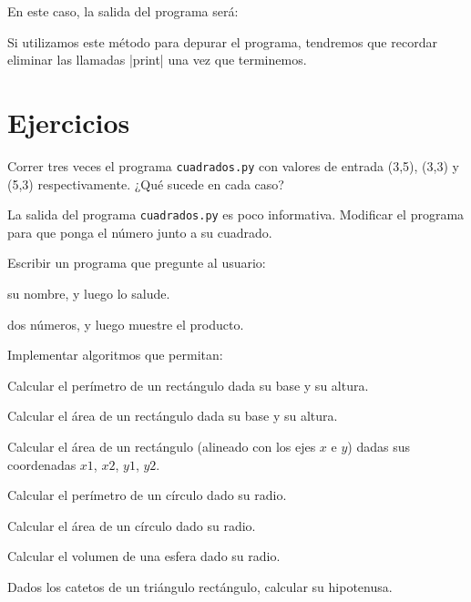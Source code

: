 En este caso, la salida del programa será:


Si utilizamos este método para depurar el programa, tendremos que recordar
eliminar las llamadas |print| una vez que terminemos.

\newpage
\section{Ejercicios}

\begin{ejercicio}
Correr tres veces el programa \lstinline!cuadrados.py! con valores
de entrada (3,5), (3,3) y (5,3) respectivamente. ¿Qué sucede en
cada caso?
\end{ejercicio}

\begin{ejercicio}
La salida del programa \lstinline!cuadrados.py! es poco
informativa. Modificar el programa para que ponga el
número junto a su cuadrado.
\end{ejercicio}

\begin{ejercicio}
Escribir un programa que pregunte al usuario:
\begin{partes}
  \item su nombre, y luego lo salude.
  \item dos números, y luego muestre el producto.
\end{partes}
\end{ejercicio}

\begin{ejercicio} Implementar algoritmos que permitan:
\begin{partes}
 \item Calcular el perímetro de un rectángulo dada su base y su altura.
 \item Calcular el área de un rectángulo dada su base y su altura.
 \item Calcular el área de un rectángulo (alineado con los ejes $x$ e $y$)
     dadas sus coordenadas $x1$, $x2$, $y1$, $y2$.
 \item Calcular el perímetro de un círculo dado su radio.
 \item Calcular el área de un círculo dado su radio.
 \item Calcular el volumen de una esfera dado su radio.
 \item Dados los catetos de un triángulo rectángulo, calcular su hipotenusa.
\end{partes}
\end{ejercicio}

